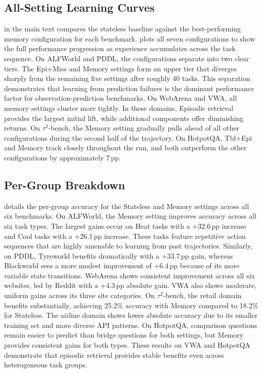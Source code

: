 \documentclass{article}
\begin{document}
\subsection{All-Setting Learning Curves}
\label{app:all_learning_curves}



 in the main text compares the stateless baseline against the best-performing memory configuration for each benchmark.  plots all seven configurations to show the full performance progression as experience accumulates across the task sequence. On ALFWorld and PDDL, the configurations separate into two clear tiers. The Epi+Miss and Memory settings form an upper tier that diverges sharply from the remaining five settings after roughly 40 tasks. This separation demonstrates that learning from prediction failures is the dominant performance factor for observation-prediction benchmarks. On WebArena and VWA, all memory settings cluster more tightly. In these domains, Episodic retrieval provides the largest initial lift, while additional components offer diminishing returns. On $\tau^{2}$-bench, the Memory setting gradually pulls ahead of all other configurations during the second half of the trajectory. On HotpotQA, Tbl+Epi and Memory track closely throughout the run, and both outperform the other configurations by approximately 7\,pp.

\subsection{Per-Group Breakdown}
\label{app:per_task}



 details the per-group accuracy for the Stateless and Memory settings across all six benchmarks. On ALFWorld, the Memory setting improves accuracy across all six task types. The largest gains occur on Heat tasks with a +32.6\,pp increase and Cool tasks with a +26.1\,pp increase. These tasks feature repetitive action sequences that are highly amenable to learning from past trajectories. Similarly, on PDDL, Tyreworld benefits dramatically with a +33.7\,pp gain, whereas Blockworld sees a more modest improvement of +6.4\,pp because of its more variable state transitions. WebArena shows consistent improvement across all six websites, led by Reddit with a +4.3\,pp absolute gain. VWA also shows moderate, uniform gains across its three site categories. On $\tau^{2}$-bench, the retail domain benefits substantially, achieving 25.2\% accuracy with Memory compared to 18.2\% for Stateless. The airline domain shows lower absolute accuracy due to its smaller training set and more diverse API patterns. On HotpotQA, comparison questions remain easier to predict than bridge questions for both settings, but Memory provides consistent gains for both types. These results on VWA and HotpotQA demonstrate that episodic retrieval provides stable benefits even across heterogeneous task groups.
\end{document}
